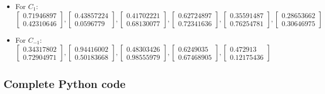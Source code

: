 \documentclass[letterpaper,headings=standardclasses]{scrartcl}
\begin{document}
\begin{itemize}
    \item For $C_1$:
    $$ \left[ \begin{matrix} 0.71946897 \\ 0.42310646 \end{matrix} \right], \left[ \begin{matrix} 0.43857224 \\ 0.0596779 \end{matrix} \right],     \left[ \begin{matrix} 0.41702221 \\ 0.68130077 \end{matrix} \right],     \left[ \begin{matrix} 0.62724897 \\ 0.72341636 \end{matrix} \right],     \left[ \begin{matrix} 0.35591487 \\ 0.76254781 \end{matrix} \right],     \left[ \begin{matrix} 0.28653662 \\ 0.30646975 \end{matrix} \right] $$

    \item For $C_{-1}$:
    $$ \left[ \begin{matrix} 0.34317802 \\ 0.72904971 \end{matrix} \right], \left[ \begin{matrix} 0.94416002 \\ 0.50183668 \end{matrix} \right], \left[ \begin{matrix} 0.48303426 \\ 0.98555979 \end{matrix} \right], \left[ \begin{matrix} 0.6249035 \\ 0.67468905 \end{matrix} \right], \left[ \begin{matrix} 0.472913 \\ 0.12175436 \end{matrix} \right] $$
\end{itemize}

\subsection{Complete Python code}


\end{document}
